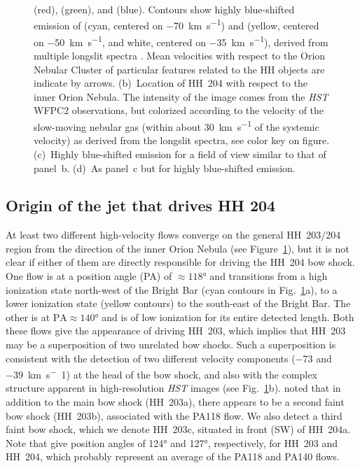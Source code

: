 \documentclass[twocolumn]{aastex63}
\begin{document}
\begin{figure}
{    \oiii{} (red), \nii{} (green), and \ha{} (blue).
    Contours show highly blue-shifted emission of \oiii{}
    (cyan, centered on \SI{-70}{km.s^{-1}})
    and \nii{}
    (yellow, centered on \SI{-50}{km.s^{-1}}, and white, centered on \SI{-35}{km.s^{-1}}),
    derived from multiple longslit spectra
    \citetext{\citealp{Doi:2004a}
      as recalibrated in spectral atlas of \citealp{Garcia-Diaz:2008a}}.
    Mean velocities with respect to the Orion Nebular Cluster
    of particular features related to the HH objects are indicate by arrows.
    (b)~Location of HH~204 with respect to the inner Orion Nebula.
    The intensity of the image comes from the \nii{} \textit{HST} WFPC2 observations,
    but colorized according to the velocity of the slow-moving nebular gas
    (within about \SI{30}{km.s^{-1}} of the systemic velocity) as derived from the
    longslit spectra, see color key on figure.
    (c)~Highly blue-shifted \oiii{} emission for a field of view similar to that of panel~b.
    (d)~As panel~c but for highly blue-shifted \nii{} emission.
    }
  \label{fig:hh204-finding-chart}
\end{figure}

\subsection{Origin of the jet that drives HH 204}
\label{sec:origin-jet-that}

At least two different high-velocity flows
converge on the general HH~203/204 region
from the direction of the inner Orion Nebula (see Figure~\ref{fig:hh204-finding-chart}),
but it is not clear if either of them are directly responsible for driving the
HH~204 bow shock.
One flow is at a position angle (PA) of \(\approx \ang{118}\) and transitions 
from a high ionization state north-west of the Bright Bar
(cyan contours in Fig.~\ref{fig:hh204-finding-chart}a),
to a lower ionization state (yellow contours) to the south-east of the Bright Bar.
The other is at \(\mathrm{PA} \approx \ang{140}\)
and is of low ionization for its entire detected length. 
Both these flows give the appearance of driving HH~203,
which implies that HH~203 may be a superposition of two unrelated bow shocks.
Such a superposition is consistent with the detection of two
different velocity components (\num{-73} and \SI{-39}{km.s^-1})
at the head of the bow shock, and also with the complex structure
apparent in high-resolution \textit{HST} images (see Fig.~\ref{fig:hh204-finding-chart}b).
\citet{ODell:2015a} noted that in addition to the main bow shock (HH~203a),
there appears to be a second faint bow shock (HH~203b), associated with
the PA118 flow.
We also detect a third faint bow shock, which we denote HH~203c,
situated in front (SW) of HH~204a.
Note that \citet{ODell:2015a} give position angles of \ang{124} and \ang{127},
respectively, for HH~203 and HH~204, which probably represent an average of the 
PA118 and PA140 flows. 
\end{document}
